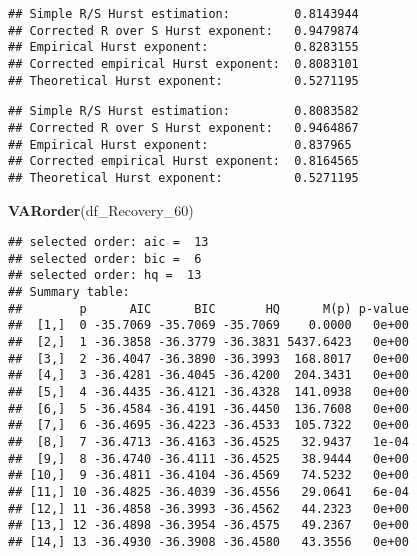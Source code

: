 \documentclass[
]{article}
\newenvironment{Shaded}{\begin{snugshade}}{\end{snugshade}}
\newcommand{\FunctionTok}[1]{\textcolor[rgb]{0.13,0.29,0.53}{\textbf{#1}}}
\newcommand{\NormalTok}[1]{#1}
\newcommand{\SpecialCharTok}[1]{\textcolor[rgb]{0.81,0.36,0.00}{\textbf{#1}}}
\begin{document}
\begin{verbatim}
## Simple R/S Hurst estimation:         0.8143944 
## Corrected R over S Hurst exponent:   0.9479874 
## Empirical Hurst exponent:            0.8283155 
## Corrected empirical Hurst exponent:  0.8083101 
## Theoretical Hurst exponent:          0.5271195
\end{verbatim}

\begin{Shaded}
\end{Shaded}

\begin{verbatim}
## Simple R/S Hurst estimation:         0.8083582 
## Corrected R over S Hurst exponent:   0.9464867 
## Empirical Hurst exponent:            0.837965 
## Corrected empirical Hurst exponent:  0.8164565 
## Theoretical Hurst exponent:          0.5271195
\end{verbatim}

\begin{Shaded}
\begin{Highlighting}[]
\FunctionTok{VARorder}\NormalTok{(df\_Recovery\_60)}
\end{Highlighting}
\end{Shaded}

\begin{verbatim}
## selected order: aic =  13 
## selected order: bic =  6 
## selected order: hq =  13 
## Summary table:  
##        p      AIC      BIC       HQ      M(p) p-value
##  [1,]  0 -35.7069 -35.7069 -35.7069    0.0000   0e+00
##  [2,]  1 -36.3858 -36.3779 -36.3831 5437.6423   0e+00
##  [3,]  2 -36.4047 -36.3890 -36.3993  168.8017   0e+00
##  [4,]  3 -36.4281 -36.4045 -36.4200  204.3431   0e+00
##  [5,]  4 -36.4435 -36.4121 -36.4328  141.0938   0e+00
##  [6,]  5 -36.4584 -36.4191 -36.4450  136.7608   0e+00
##  [7,]  6 -36.4695 -36.4223 -36.4533  105.7322   0e+00
##  [8,]  7 -36.4713 -36.4163 -36.4525   32.9437   1e-04
##  [9,]  8 -36.4740 -36.4111 -36.4525   38.9444   0e+00
## [10,]  9 -36.4811 -36.4104 -36.4569   74.5232   0e+00
## [11,] 10 -36.4825 -36.4039 -36.4556   29.0641   6e-04
## [12,] 11 -36.4858 -36.3993 -36.4562   44.2323   0e+00
## [13,] 12 -36.4898 -36.3954 -36.4575   49.2367   0e+00
## [14,] 13 -36.4930 -36.3908 -36.4580   43.3556   0e+00
\end{verbatim}
\end{document}
